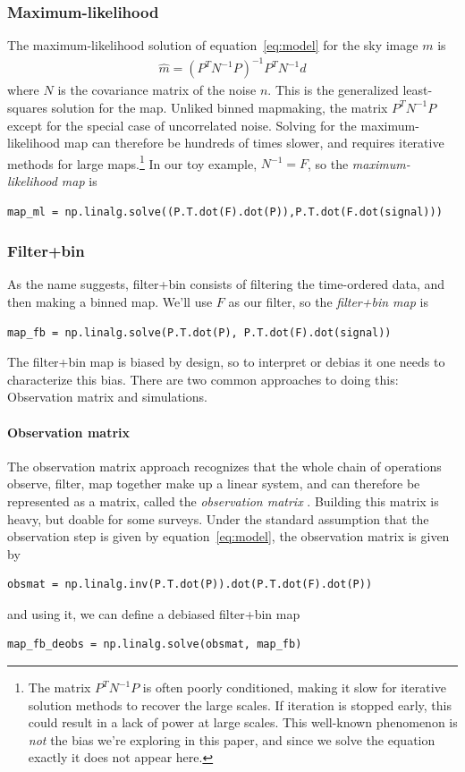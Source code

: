 \documentclass[twocolumn,apj]{aastex63}
\begin{document}
\subsubsection{Maximum-likelihood}
The maximum-likelihood solution of equation~\ref{eq:model} for the
sky image $m$ is
\begin{align}
	\hat m = (P^TN^{-1}P)^{-1}P^TN^{-1}d
\end{align}
where $N$ is the covariance matrix of the noise $n$. This is the
generalized least-squares solution for the map. Unliked binned
mapmaking, the matrix $P ^TN^{-1}P$ except for the special case
of uncorrelated noise. Solving for the maximum-likelihood map
can therefore be hundreds of times slower, and requires
iterative methods for large maps.\footnote{
	The matrix $P^TN^{-1}P$ is often poorly conditioned, making it slow
	for iterative solution methods to recover the large scales. If iteration is
	stopped early, this could result in a lack of power at large scales.
	This well-known phenomenon is \emph{not} the bias we're exploring in
	this paper, and since we solve the equation exactly it does not
	appear here.
}
In our toy example, $N^{-1} = F$, so the \emph{maximum-likelihood map}
is
\begin{lstlisting}
map_ml = np.linalg.solve((P.T.dot(F).dot(P)),P.T.dot(F.dot(signal)))
\end{lstlisting}

\subsubsection{Filter+bin}
As the name suggests, filter+bin consists of filtering the time-ordered
data, and then making a binned map. We'll use $F$ as our filter, so
the \emph{filter+bin map} is
\begin{lstlisting}
map_fb = np.linalg.solve(P.T.dot(P), P.T.dot(F).dot(signal))
\end{lstlisting}
The filter+bin map is biased by design, so to interpret or debias it one
needs to characterize this bias. There are two common approaches
to doing this: Observation matrix and simulations.

\paragraph{Observation matrix}
The observation matrix approach
recognizes that the whole chain of operations observe, filter, map
together make up a linear system, and can therefore be represented
as a matrix, called the \emph{observation matrix} \citep{bicep2-obsmat}.
Building this matrix is heavy, but doable for some
surveys. Under the standard assumption that the observation step is
given by equation~\ref{eq:model}, the observation matrix is given by
\begin{lstlisting}
obsmat = np.linalg.inv(P.T.dot(P)).dot(P.T.dot(F).dot(P))
\end{lstlisting}
and using it, we can define a debiased filter+bin map
\begin{lstlisting}
map_fb_deobs = np.linalg.solve(obsmat, map_fb)
\end{lstlisting}
\end{document}
